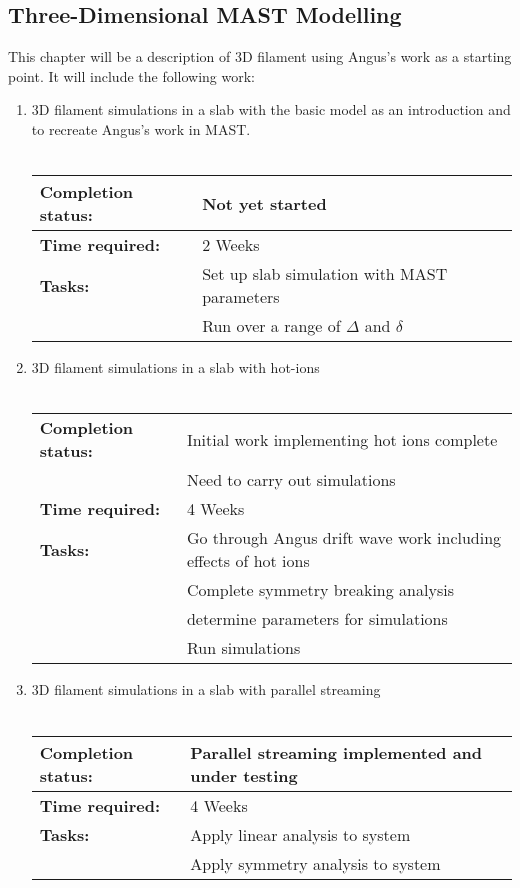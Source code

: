 \documentclass[11pt]{article}
\begin{document}
\subsection{Three-Dimensional MAST Modelling}
This chapter will be a description of 3D filament using Angus's work as a starting point. It will include the following work:
\begin{enumerate}
\item 3D filament simulations in a slab with the basic model as an introduction and to recreate Angus's work in MAST. \\ \\
\begin{tabular}{l l}
\hline
\textbf{Completion status:} &  Not yet started \\
\hline
  \textbf{Time required:} & 2 Weeks \\
\hline
\textbf{Tasks:} &
      Set up slab simulation with MAST parameters
\\ &  Run over a range of $\Delta$ and $\delta$
\end{tabular}
\item 3D filament simulations in a slab with hot-ions \\ \\
\begin{tabular}{l l}
\hline
\textbf{Completion status:} &  Initial work implementing hot ions complete \\
 & Need to carry out simulations \\
\hline
  \textbf{Time required:} & 4 Weeks \\
\hline
\textbf{Tasks:} &
      Go through Angus drift wave work including effects of hot ions
\\ & Complete symmetry breaking analysis \\
 &  determine parameters for simulations
\\ &  Run simulations
\end{tabular}
\item 3D filament simulations in a slab with parallel streaming \\ \\
\begin{tabular}{l l}
\hline
\textbf{Completion status:} &  Parallel streaming implemented and under testing \\
\hline
  \textbf{Time required:} & 4 Weeks \\
\hline
\textbf{Tasks:} &
      Apply linear analysis to system 
\\ &  Apply symmetry analysis to system\\

\end{tabular}
\end{enumerate}
\end{document}
